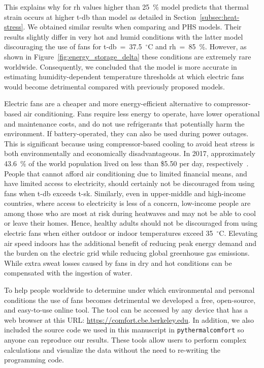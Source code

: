 This explains why for \ac{rh} values higher than 25~\%  model predicts that thermal strain occurs at higher \ac{t-db} than  model as detailed in Section~\ref{subsec:heat-stress}.
We obtained similar results when comparing  and PHS models.
Their results slightly differ in very hot and humid conditions with the latter model discouraging the use of fans for \ac{t-db}~=~37.5~$^{\circ}$C and \ac{rh}~=~85~\%\@.
However, as shown in Figure~\ref{fig:energy_storage_delta} these conditions are extremely rare worldwide.
Consequently, we concluded that the  model is more accurate in estimating humidity-dependent temperature thresholds at which electric fans would become detrimental compared with previously proposed models.

Electric fans are a cheaper and more energy-efficient alternative to compressor-based air conditioning.
Fans require less energy to operate, have lower operational and maintenance costs, and do not use refrigerants that potentially harm the environment. 
If battery-operated, they can also be used during power outages.
This is significant because using compressor-based cooling to avoid heat stress is both environmentally and economically disadvantageous.
In 2017, approximately 43.6~\% of the world population lived on less than \$5.50 per day, respectively~\cite{PovertyO1:online}.
People that cannot afford air conditioning due to limited financial means, and have limited access to electricity, should certainly not be discouraged from using fans when \ac{t-db} exceeds \ac{t-sk}.
Similarly, even in upper-middle and high-income countries, where access to electricity is less of a concern, low-income people are among those who are most at risk during heatwaves and may not be able to cool or leave their homes.
Hence, healthy adults should not be discouraged from using electric fans when either outdoor or indoor temperatures exceed 35~$^{\circ}$C.\@
Elevating air speed indoors has the additional benefit of reducing peak energy demand and the burden on the electric grid while reducing global greenhouse gas emissions.
While extra sweat losses caused by fans in dry and hot conditions can be compensated with the ingestion of water.

To help people worldwide to determine under which environmental and personal conditions the use of fans becomes detrimental we developed a free, open-source, and easy-to-use online tool.
The tool can be accessed by any device that has a web browser at this URL: \url{https://comfort.cbe.berkeley.edu}.
In addition, we also included the source code we used in this manuscript in \verb|pythermalcomfort| so anyone can reproduce our results.
These tools allow users to perform complex calculations and visualize the data without the need to re-writing the programming code.

